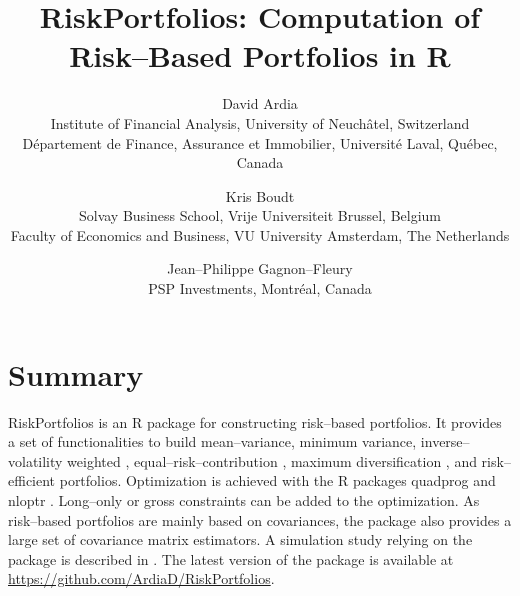\documentclass[11pt]{article}
\begin{document}
\title{RiskPortfolios: Computation of Risk--Based Portfolios in R}
\author{David Ardia\\
Institute of Financial Analysis, University of Neuch\^atel, Switzerland\\
D\'epartement de Finance, Assurance et Immobilier, Universit\'e Laval, Qu\'ebec, Canada
\and
Kris Boudt\\
Solvay Business School, Vrije Universiteit Brussel, Belgium\\
Faculty of Economics and Business, VU University Amsterdam, The Netherlands
\and
Jean--Philippe Gagnon--Fleury\\
PSP Investments, Montr\'eal, Canada
}
	
\maketitle

\section*{Summary}

RiskPortfolios is an R package \citep{R} for constructing risk--based portfolios. It provides a set of 
functionalities to build mean--variance, minimum variance, inverse--volatility weighted \citep{LeoteEtAl2012}, 
equal--risk--contribution \citep{MaillardEtAl2010}, maximum diversification \citep{Choueifaty2008}, and 
risk--efficient \citep{AmencEtAl2011} portfolios. Optimization is achieved with the R packages quadprog \citep{quadprog} and nloptr \citep{nloptr}. 
Long--only or gross constraints can be added to the optimization. 
As risk--based portfolios are mainly based on covariances, the package also provides a large set of covariance matrix estimators. A simulation study relying on the package
is described in \citet{ArdiaEtAl2016}. The latest version of the package is 
available at \url{https://github.com/ArdiaD/RiskPortfolios}.



	
\end{document}
